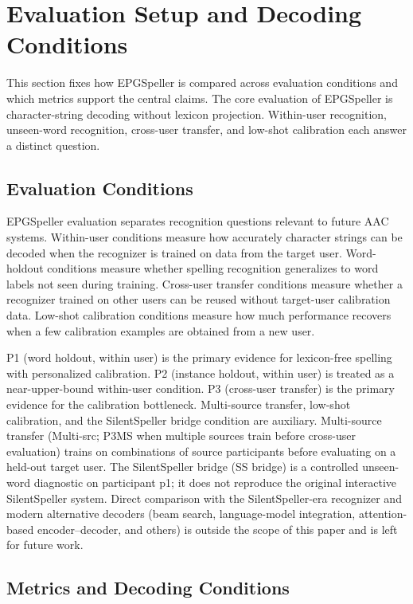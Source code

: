 \section{Evaluation Setup and Decoding Conditions}
\label{sec:evaluation}

This section fixes how EPGSpeller is compared across evaluation conditions and which metrics support the central claims.
The core evaluation of EPGSpeller is character-string decoding without lexicon projection.
Within-user recognition, unseen-word recognition, cross-user transfer, and low-shot calibration each answer a distinct question.

\subsection{Evaluation Conditions}

EPGSpeller evaluation separates recognition questions relevant to future AAC systems.
Within-user conditions measure how accurately character strings can be decoded when the recognizer is trained on data from the target user.
Word-holdout conditions measure whether spelling recognition generalizes to word labels not seen during training.
Cross-user transfer conditions measure whether a recognizer trained on other users can be reused without target-user calibration data.
Low-shot calibration conditions measure how much performance recovers when a few calibration examples are obtained from a new user.

P1 (word holdout, within user) is the primary evidence for lexicon-free spelling with personalized calibration.
P2 (instance holdout, within user) is treated as a near-upper-bound within-user condition.
P3 (cross-user transfer) is the primary evidence for the calibration bottleneck.
Multi-source transfer, low-shot calibration, and the SilentSpeller bridge condition are auxiliary.
Multi-source transfer (Multi-src; P3MS when multiple sources train before cross-user evaluation) trains on combinations of source participants before evaluating on a held-out target user.
The SilentSpeller bridge (SS bridge) is a controlled unseen-word diagnostic on participant p1; it does not reproduce the original interactive SilentSpeller system.
Direct comparison with the SilentSpeller-era recognizer and modern alternative decoders (beam search, language-model integration, attention-based encoder--decoder, and others) is outside the scope of this paper and is left for future work.

\subsection{Metrics and Decoding Conditions}

